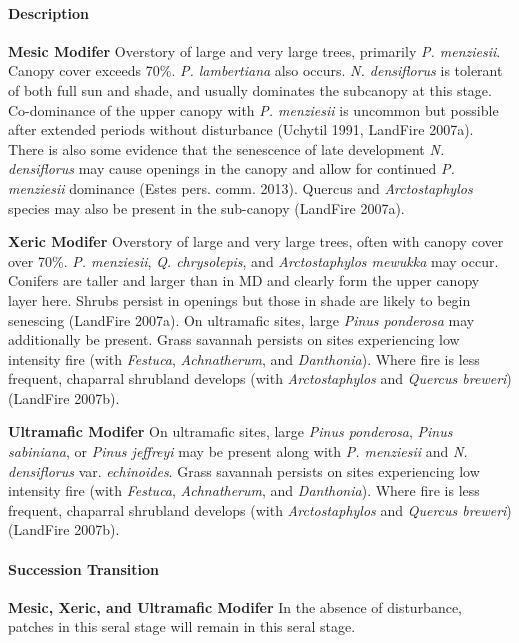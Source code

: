 \paragraph{Description}
\begin{adjustwidth}{2cm}{}
\textbf{Mesic Modifer } Overstory of large and very large trees, primarily \emph{P. menziesii}. Canopy cover exceeds 70\%. \emph{P. lambertiana} also occurs. \emph{N. densiflorus} is tolerant of both full sun and shade, and usually dominates the subcanopy at this stage. Co-dominance of the upper canopy with \emph{P. menziesii} is uncommon but possible after extended periods without disturbance (Uchytil 1991, LandFire 2007a). There is also some evidence that the senescence of late development \emph{N. densiflorus} may cause openings in the canopy and allow for continued \emph{P. menziesii} dominance (Estes pers. comm. 2013). Quercus and \emph{Arctostaphylos} species may also be present in the sub-canopy (LandFire 2007a).

\medskip
\noindent \textbf{Xeric Modifer} Overstory of large and very large trees, often with canopy cover over 70\%. \emph{P. menziesii}, \emph{Q. chrysolepis}, and \emph{Arctostaphylos mewukka} may occur. Conifers are taller and larger than in MD and clearly form the upper canopy layer here. Shrubs persist in openings but those in shade are likely to begin senescing (LandFire 2007a). On ultramafic sites, large \emph{Pinus ponderosa} may additionally be present. Grass savannah persists on sites experiencing low intensity fire (with \emph{Festuca}, \emph{Achnatherum}, and \emph{Danthonia}). Where fire is less frequent, chaparral shrubland develops (with \emph{Arctostaphylos} and \emph{Quercus breweri}) (LandFire 2007b).

\medskip
\noindent \textbf{Ultramafic Modifer} On ultramafic sites, large \emph{Pinus ponderosa}, \emph{Pinus sabiniana}, or \emph{Pinus jeffreyi} may be present along with \emph{P. menziesii} and \emph{N. densiflorus} var. \emph{echinoides}. Grass savannah persists on sites experiencing low intensity fire (with \emph{Festuca}, \emph{Achnatherum}, and \emph{Danthonia}). Where fire is less frequent, chaparral shrubland develops (with \emph{Arctostaphylos} and \emph{Quercus breweri}) (LandFire 2007b).

\end{adjustwidth}

\paragraph{Succession Transition}
\begin{adjustwidth}{2cm}{}
\textbf{Mesic, Xeric, and Ultramafic Modifer } In the absence of disturbance, patches in this seral stage will remain in this seral stage. 

\end{adjustwidth}

